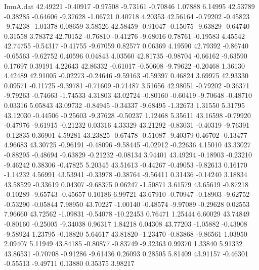 \begin{filecontents}{ImuA.dat}
  42.49221   -0.40917   -0.97508   -9.73161   -0.70846    1.07888    6.14995
  42.53789   -0.38285   -0.64606   -9.37628   -1.06721    0.40718    4.20353
  42.56164   -0.79202   -0.45823   -9.74238   -1.01378    0.08659    3.58526
  42.58459   -0.91047   -0.15075   -9.63829   -0.64740    0.31558    3.78372
  42.70152   -0.76810   -0.41276   -9.68016    0.78761   -0.19583    4.45542
  42.74755   -0.54317   -0.41755   -9.67059    0.82577    0.06369    4.19590
  42.79392   -0.86740   -0.65563   -9.62752    0.40596    0.04843    4.03560
  42.81735   -0.98704   -0.66162   -9.63590    0.17697    0.39191    4.22643
  42.86332   -0.61017   -0.50608   -9.79622   -0.20468    1.36130    4.42489
  42.91005   -0.02273   -0.24646   -9.59163   -0.59397    0.46824    3.69975
  42.93330    0.09571   -0.11725   -9.39781   -0.71609   -0.71487    3.51656
  42.98051   -0.79202   -0.36371   -9.79263   -0.74663   -1.74533    4.31803
  43.02724   -0.80160   -0.60419   -9.70648   -0.48710    0.03316    5.05843
  43.09732   -0.84945   -0.34337   -9.68495   -1.32673    1.31550    5.31795
  43.12030   -0.44506   -0.25603   -9.37628   -0.50237    1.12468    5.35611
  43.16598   -0.79920   -0.47976   -9.61915   -0.21232    0.03316    4.33329
  43.21292   -0.83031   -0.40319   -9.76391   -0.12835    0.36901    4.59281
  43.23825   -0.67478   -0.51087   -9.40379    0.46702   -0.13477    4.96683
  43.30725   -0.96191   -0.48096   -9.58445   -0.02912   -0.22636    4.15010
  43.33027   -0.88295   -0.48694   -9.63829   -0.21232   -0.08134    3.94401
  43.49294   -0.18903   -0.23210   -9.46242    0.38306   -0.47825    5.20345
  43.51613   -0.44267   -0.49053   -9.82613    0.16170   -1.14232    4.56991
  43.53941   -0.33978   -0.38764   -9.56411    0.31436   -0.14240    3.18834
  43.58529   -0.33619    0.04307   -9.68375    0.06247   -1.50871    3.61579
  43.65619   -0.87218   -0.10289   -9.65743   -0.45657    0.10186    6.99721
  43.67910   -0.70947   -0.18903   -9.62752   -0.53290   -0.05844    7.98950
  43.70227   -1.00140   -0.48574   -9.97089   -0.29628    0.02553    7.96660
  43.72562   -1.09831   -0.54078  -10.22453    0.76471    1.25444    6.60029
  43.74849   -0.80160   -0.25005   -9.34038    0.96317    1.84218    6.04308
  43.77203   -1.05882   -0.43908   -9.58924    1.23795   -0.18820    5.64617
  43.81820   -1.23470   -0.83868   -9.86561    1.03950    2.09407    5.11949
  43.84185   -0.80877   -0.83749   -9.32363    0.99370    1.33840    5.91332
  43.86531   -0.70708   -0.91286   -9.61436    0.26093    0.28505    5.81409
  43.91157   -0.46301   -0.55513   -9.49711    0.13880    0.35375    3.98217

\end{filecontents}
